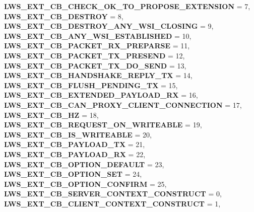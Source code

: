 \begin{DoxyCompactItemize}
{\bfseries L\+W\+S\+\_\+\+E\+X\+T\+\_\+\+C\+B\+\_\+\+C\+H\+E\+C\+K\+\_\+\+O\+K\+\_\+\+T\+O\+\_\+\+P\+R\+O\+P\+O\+S\+E\+\_\+\+E\+X\+T\+E\+N\+S\+I\+ON} = 7, 
\newline
{\bfseries L\+W\+S\+\_\+\+E\+X\+T\+\_\+\+C\+B\+\_\+\+D\+E\+S\+T\+R\+OY} = 8, 
{\bfseries L\+W\+S\+\_\+\+E\+X\+T\+\_\+\+C\+B\+\_\+\+D\+E\+S\+T\+R\+O\+Y\+\_\+\+A\+N\+Y\+\_\+\+W\+S\+I\+\_\+\+C\+L\+O\+S\+I\+NG} = 9, 
{\bfseries L\+W\+S\+\_\+\+E\+X\+T\+\_\+\+C\+B\+\_\+\+A\+N\+Y\+\_\+\+W\+S\+I\+\_\+\+E\+S\+T\+A\+B\+L\+I\+S\+H\+ED} = 10, 
{\bfseries L\+W\+S\+\_\+\+E\+X\+T\+\_\+\+C\+B\+\_\+\+P\+A\+C\+K\+E\+T\+\_\+\+R\+X\+\_\+\+P\+R\+E\+P\+A\+R\+SE} = 11, 
\newline
{\bfseries L\+W\+S\+\_\+\+E\+X\+T\+\_\+\+C\+B\+\_\+\+P\+A\+C\+K\+E\+T\+\_\+\+T\+X\+\_\+\+P\+R\+E\+S\+E\+ND} = 12, 
{\bfseries L\+W\+S\+\_\+\+E\+X\+T\+\_\+\+C\+B\+\_\+\+P\+A\+C\+K\+E\+T\+\_\+\+T\+X\+\_\+\+D\+O\+\_\+\+S\+E\+ND} = 13, 
{\bfseries L\+W\+S\+\_\+\+E\+X\+T\+\_\+\+C\+B\+\_\+\+H\+A\+N\+D\+S\+H\+A\+K\+E\+\_\+\+R\+E\+P\+L\+Y\+\_\+\+TX} = 14, 
{\bfseries L\+W\+S\+\_\+\+E\+X\+T\+\_\+\+C\+B\+\_\+\+F\+L\+U\+S\+H\+\_\+\+P\+E\+N\+D\+I\+N\+G\+\_\+\+TX} = 15, 
\newline
{\bfseries L\+W\+S\+\_\+\+E\+X\+T\+\_\+\+C\+B\+\_\+\+E\+X\+T\+E\+N\+D\+E\+D\+\_\+\+P\+A\+Y\+L\+O\+A\+D\+\_\+\+RX} = 16, 
{\bfseries L\+W\+S\+\_\+\+E\+X\+T\+\_\+\+C\+B\+\_\+\+C\+A\+N\+\_\+\+P\+R\+O\+X\+Y\+\_\+\+C\+L\+I\+E\+N\+T\+\_\+\+C\+O\+N\+N\+E\+C\+T\+I\+ON} = 17, 
{\bfseries L\+W\+S\+\_\+\+E\+X\+T\+\_\+\+C\+B\+\_\+HZ} = 18, 
{\bfseries L\+W\+S\+\_\+\+E\+X\+T\+\_\+\+C\+B\+\_\+\+R\+E\+Q\+U\+E\+S\+T\+\_\+\+O\+N\+\_\+\+W\+R\+I\+T\+E\+A\+B\+LE} = 19, 
\newline
{\bfseries L\+W\+S\+\_\+\+E\+X\+T\+\_\+\+C\+B\+\_\+\+I\+S\+\_\+\+W\+R\+I\+T\+E\+A\+B\+LE} = 20, 
{\bfseries L\+W\+S\+\_\+\+E\+X\+T\+\_\+\+C\+B\+\_\+\+P\+A\+Y\+L\+O\+A\+D\+\_\+\+TX} = 21, 
{\bfseries L\+W\+S\+\_\+\+E\+X\+T\+\_\+\+C\+B\+\_\+\+P\+A\+Y\+L\+O\+A\+D\+\_\+\+RX} = 22, 
{\bfseries L\+W\+S\+\_\+\+E\+X\+T\+\_\+\+C\+B\+\_\+\+O\+P\+T\+I\+O\+N\+\_\+\+D\+E\+F\+A\+U\+LT} = 23, 
\newline
{\bfseries L\+W\+S\+\_\+\+E\+X\+T\+\_\+\+C\+B\+\_\+\+O\+P\+T\+I\+O\+N\+\_\+\+S\+ET} = 24, 
{\bfseries L\+W\+S\+\_\+\+E\+X\+T\+\_\+\+C\+B\+\_\+\+O\+P\+T\+I\+O\+N\+\_\+\+C\+O\+N\+F\+I\+RM} = 25, 
{\bfseries L\+W\+S\+\_\+\+E\+X\+T\+\_\+\+C\+B\+\_\+\+S\+E\+R\+V\+E\+R\+\_\+\+C\+O\+N\+T\+E\+X\+T\+\_\+\+C\+O\+N\+S\+T\+R\+U\+CT} = 0, 
{\bfseries L\+W\+S\+\_\+\+E\+X\+T\+\_\+\+C\+B\+\_\+\+C\+L\+I\+E\+N\+T\+\_\+\+C\+O\+N\+T\+E\+X\+T\+\_\+\+C\+O\+N\+S\+T\+R\+U\+CT} = 1, 

\end{DoxyCompactItemize}
